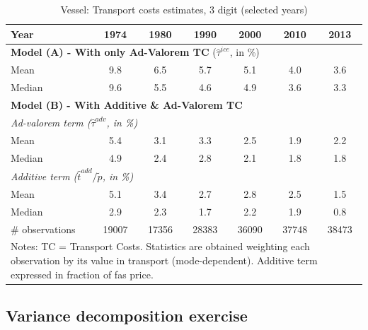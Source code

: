 \documentclass[a4paper,11pt]{article}
\begin{document}
\begin{table}[htbp]
  \centering
  \caption{Vessel: Transport costs estimates, 3 digit (selected years)}
\begin{center}
    \begin{tabular}{l|cccccc}
   \hline\hline
Year         & 1974  & 1980  & 1990  & 2000  & 2010  & 2013   \\
 \hline
   \multicolumn{7}{l}{\textbf{Model (A) - With only Ad-Valorem TC} ($\widehat{\tau}^{ice}$, in \%)}  \\
   \hline
Mean  & 9.8 & 6.5 & 5.7 & 5.1 & 4.0 & 3.6  \\
Median & 9.6 & 5.5 & 4.6 & 4.9 & 3.6 & 3.3  \\
\hline
\multicolumn{7}{l}{\textbf{Model (B) - With Additive \& Ad-Valorem TC}}    \\
\hline
\multicolumn{7}{l}{\textit{Ad-valorem term ($\widehat{\tau}^{adv}$, in \%)} } \\
\hline
Mean  & 5.4 & 3.1 & 3.3 & 2.5 & 1.9 & 2.2 \\
Median & 4.9 & 2.4 & 2.8 & 2.1 & 1.8 & 1.8  \\
\hline
\multicolumn{7}{l}{\textit{Additive term ($\widehat{t}^{add}/\widetilde{p}$, in \%)}}  \\
\hline
Mean  & 5.1 & 3.4 & 2.7 & 2.8 & 2.5 & 1.5  \\
Median & 2.9 & 2.3 & 1.7 & 2.2 & 1.9 & 0.8 \\
\hline
 \# observations & 19007 & 17356 & 28383 & 36090 & 37748 & 38473 \\
\hline\hline
\multicolumn{7}{l}{\parbox[l]{11cm}{ \vspace{7pt}\scriptsize{Notes: TC = Transport Costs. Statistics are obtained weighting each observation by its value in transport (mode-dependent). Additive term expressed in fraction of fas price.}}}
\end{tabular}%
\end{center} \label{tab:result_ves_3d_detail}
\end{table}%


\subsection{Variance decomposition exercise \label{app:decomp_variance}}
\end{document}
